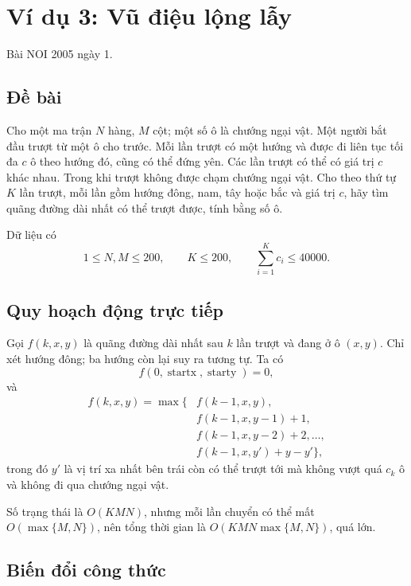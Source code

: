 \documentclass[11pt]{article}
\begin{document}
\section{Ví dụ 3: Vũ điệu lộng lẫy}

Bài NOI 2005 ngày 1.

\subsection*{Đề bài}

Cho một ma trận $N$ hàng, $M$ cột; một số ô là chướng ngại vật. Một người bắt
đầu trượt từ một ô cho trước. Mỗi lần trượt có một hướng và được đi liên tục
tối đa $c$ ô theo hướng đó, cũng có thể đứng yên. Các lần trượt có thể có
giá trị $c$ khác nhau. Trong khi trượt không được chạm chướng ngại vật. Cho
theo thứ tự $K$ lần trượt, mỗi lần gồm hướng đông, nam, tây hoặc bắc và giá
trị $c$, hãy tìm quãng đường dài nhất có thể trượt được, tính bằng số ô.

Dữ liệu có
\[
  1\le N,M\le 200,\qquad K\le 200,\qquad
  \sum_{i=1}^{K}c_i\le 40000.
\]

\subsection*{Quy hoạch động trực tiếp}

Gọi $f(k,x,y)$ là quãng đường dài nhất sau $k$ lần trượt và đang ở ô
$(x,y)$. Chỉ xét hướng đông; ba hướng còn lại suy ra tương tự. Ta có
\[
  f(0,\operatorname{startx},\operatorname{starty})=0,
\]
và
\[
\begin{aligned}
  f(k,x,y)=\max\{&
    f(k-1,x,y),\\
    &f(k-1,x,y-1)+1,\\
    &f(k-1,x,y-2)+2,\ldots,\\
    &f(k-1,x,y')+y-y'\},
\end{aligned}
\]
trong đó $y'$ là vị trí xa nhất bên trái còn có thể trượt tới mà không vượt
quá $c_k$ ô và không đi qua chướng ngại vật.

Số trạng thái là $O(KMN)$, nhưng mỗi lần chuyển có thể mất
$O(\max\{M,N\})$, nên tổng thời gian là
$O(KMN\max\{M,N\})$, quá lớn.

\subsection*{Biến đổi công thức}
\end{document}
